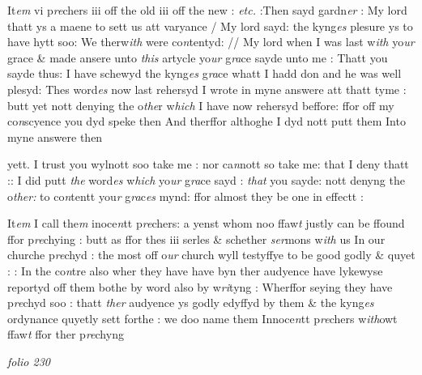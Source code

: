 \documentclass[12pt, a4paper]{book}
\begin{document}
		\ifthenelse{\isodd{\thepage}}
		{\reversemarginpar}
		{\normalmarginpar}
		It\textit{em} vi p\textit{re}chers iii off the old iii off the new : \textit{etc.} :Then sayd gardn\textit{er}
	: My 
		lord thatt ys a maene to sett us att varyance / My 
lord sayd: the kyng\textit{es} plesure ys to have hytt soo: We therw\textit{ith}
	were co\textit{n}tentyd: // My lord when I was last w\textit{ith} yo\textit{ur} grace \&
	made ansere unto \textit{this} artycle yo\textit{ur} g\textit{ra}ce sayde unto me : Thatt you
sayde thus: I have schewyd the kyng\textit{es} g\textit{ra}ce whatt I hadd don
and he was well plesyd: Thes word\textit{es} now last rehersyd
I wrote in myne answere att thatt tyme
			 : butt yet
			 nott denying the o\textit{the}r w\textit{hich} I have
now rehersyd beffore: ffor off my co\textit{n}scyence you dyd speke then
And therffor althoghe I dyd nott putt them Into myne answere then
			
yett. I trust you wylnott soo take me : nor ca\textit{n}nott so take
	me: that I deny thatt :: I did
			 putt \textit{the} word\textit{es} w\textit{hich} yo\textit{ur} g\textit{ra}ce sayd : \textit{that}
you sayde: nott denyng the o\textit{ther:} to co\textit{n}tentt you\textit{r} g\textit{ra}c\textit{es} mynd: ffor
almost they be one in effectt :

		\ifthenelse{\isodd{\thepage}}
		{\reversemarginpar}
		{\normalmarginpar}
		It\textit{em} I call the\textit{m} inoce\textit{n}tt p\textit{re}chers: a yenst whom noo ffaw\textit{t} justly can
be ffound ffor p\textit{re}chying : butt as ffor thes iii serles \& schether \textit{ser}mons
w\textit{ith} us In our churche p\textit{re}chyd : the most off o\textit{ur} church wyll testyffye to be 
good godly \& quyet : : In the co\textit{n}tre also wher they have have byn ther
audyence have lykewyse reportyd off them bothe by word also by
w\textit{ri}tyng : Wherffor seying they have p\textit{re}chyd soo : thatt \textit{ther} audyence ys godly
edyffyd by them \& the kyng\textit{es} ordynance quyetly sett forthe : we doo
name them Innoce\textit{n}tt p\textit{re}chers w\textit{ith}owt ffaw\textit{t }ffor ther p\textit{re}chyng

\dotfill
						\newpage
{}

\textit{folio 230}
\end{document}
